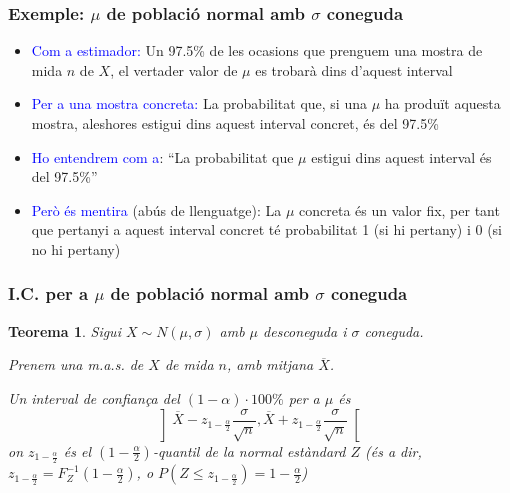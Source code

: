\documentclass[12pt,t]{beamer}
\newcommand{\blue}[1]{\textcolor{blue}{#1}}
\renewcommand{\emph}[1]{{\color{red}#1}}
\renewcommand{\leq}{\leqslant}
\theoremstyle{plain}
\newtheorem{teorema}{Teorema}
\theoremstyle{definition}
\begin{document}
\begin{frame}
\frametitle{Exemple: $\mu$ de població normal amb $\sigma$ coneguda}


\begin{itemize}
\item \blue{Com a estimador:} Un 97.5\% de les ocasions que prenguem una mostra de mida $n$ de $X$, el vertader valor de $\mu$ es trobarà dins d'aquest interval 
\medskip

\item \blue{Per a una mostra concreta:} La probabilitat que, si  una $\mu$ ha produït aquesta mostra, aleshores estigui dins aquest interval concret, és del 97.5\%
\medskip

\item \blue{Ho entendrem com a}:  ``La probabilitat que $\mu$ estigui dins aquest interval  és del 97.5\%''
\medskip

\item \blue{Però és mentira} (\emph{abús de llenguatge}): La $\mu$ concreta és un valor fix, per tant que pertanyi a aquest interval concret té probabilitat 1 (si hi pertany) i 0 (si no hi pertany) 
\end{itemize}


\end{frame}




\begin{frame}
\frametitle{I.C. per a $\mu$ de població normal amb $\sigma$ coneguda}
\vspace*{-3ex}

\begin{teorema}
Sigui $X\sim N(\mu,\sigma)$ amb $\mu$ desconeguda i $\sigma$ coneguda.
\medskip

Prenem una m.a.s. de $X$ de mida $n$, amb mitjana $\overline{X}$.
\medskip

Un interval de confiança del $(1-\alpha)\cdot 100\%$ per a $\mu$  és 
$$
\left]\overline{X} -z_{1-\frac{\alpha}{2}} \frac{\sigma}{\sqrt{n}}, \overline{X}+z_{1-\frac{\alpha}{2}}\frac{\sigma}{\sqrt{n}}
\right[
$$
on $z_{1-\frac{\alpha}{2}}$ és el $(1-\frac{\alpha}{2})$-quantil de la normal  estàndard $Z$ (és a dir, $z_{1-\frac{\alpha}{2}}=F_Z^{-1}(1-\frac{\alpha}{2})$, o $P(Z\leq z_{1-\frac{\alpha}{2}})=1-\frac{\alpha}{2}$)
\end{teorema}


\end{frame}
\end{document}
